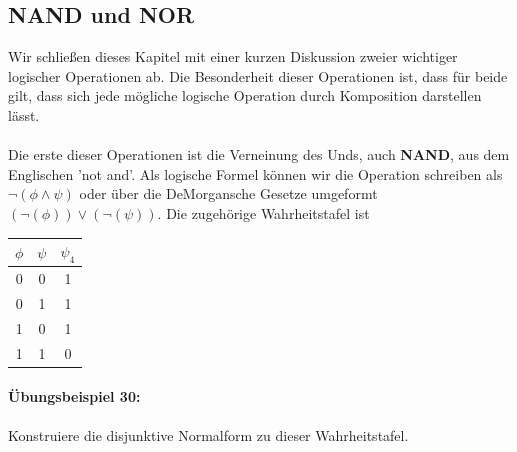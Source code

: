 \documentclass[11pt,a4paper,leqno]{report}
\numberwithin{equation}{chapter}
\begin{document}
\subsection{NAND und NOR}
Wir schlie\ss{}en dieses Kapitel mit einer kurzen Diskussion zweier wichtiger logischer Operationen ab. Die Besonderheit dieser Operationen ist, dass f\"ur beide gilt, dass sich jede m\"ogliche logische Operation durch Komposition darstellen l\"asst.\\
\\
Die erste dieser Operationen ist die Verneinung des Unds, auch \textbf{NAND}, aus dem Englischen 'not and'. Als logische Formel k\"onnen wir die Operation schreiben als $\neg(\phi\wedge\psi)$ oder \"uber die DeMorgansche Gesetze umgeformt $(\neg(\phi))\vee(\neg(\psi))$. Die zugeh\"orige Wahrheitstafel ist
\begin{center}
	\begin{tabular}{|c c|c|}
		$\phi$ & $\psi$ &$\psi_4$\\
		\hline
		0 & 0 & 1\\
		0 & 1 & 1\\
		1 & 0 & 1\\
		1 & 1 & 0\\
		\hline
	\end{tabular}  
\end{center}
\paragraph{\"Ubungsbeispiel 30:} Konstruiere die disjunktive Normalform zu dieser Wahrheitstafel.
\end{document}
